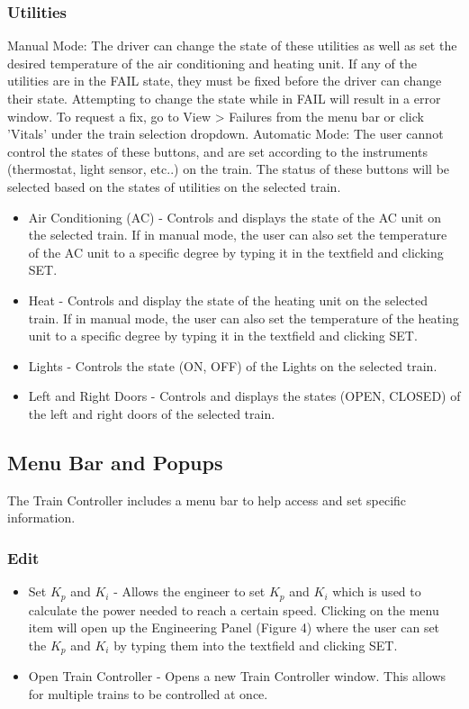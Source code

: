 \documentclass[letterpaper]{article}
\begin{document}
	\subsubsection{Utilities}
	Manual Mode: The driver can change the state of these utilities as well as set the desired temperature of the air conditioning and heating unit. If any of the utilities are in the FAIL state, they must be fixed before the driver can change their state. Attempting to change the state while in FAIL will result in a error window. To request a fix, go to View > Failures from the menu bar or click 'Vitals' under the train selection dropdown.
	\newline
	Automatic Mode: The user cannot control the states of these buttons, and are set according to the instruments (thermostat, light sensor, etc..) on the train. The status of these buttons will be selected based on the states of utilities on the selected train.
		\begin{itemize}
			\item Air Conditioning (AC) - Controls and displays the state of the AC unit on the selected train. If in manual mode, the user can also set the temperature of the AC unit to a specific degree by typing it in the textfield and clicking SET. 
			\item Heat - Controls and display the state of the heating unit on the selected train. If in manual mode, the user can also set the temperature of the heating unit to a specific degree by typing it in the textfield and clicking SET.
			\item Lights - Controls the state (ON, OFF) of the Lights on the selected train. 
			\item Left and Right Doors - Controls and displays the states (OPEN, CLOSED) of the left and right doors of the selected train.  
		\end{itemize}
	
\subsection{Menu Bar and Popups}

The Train Controller includes a menu bar to help access and set specific information.  

\subsubsection{Edit}
	\begin{itemize}
		\item Set $K_{p}$ and $K_{i}$ - Allows the engineer to set $K_{p}$ and $K_{i}$ which is used to calculate the power needed to reach a certain speed. Clicking on the menu item will open up the Engineering Panel (Figure 4) where the user can set the $K_{p}$ and $K_{i}$ by typing them into the textfield and clicking SET.
		\item Open Train Controller - Opens a new Train Controller window. This allows for multiple trains to be controlled at once. 
	\end{itemize}
\end{document}
